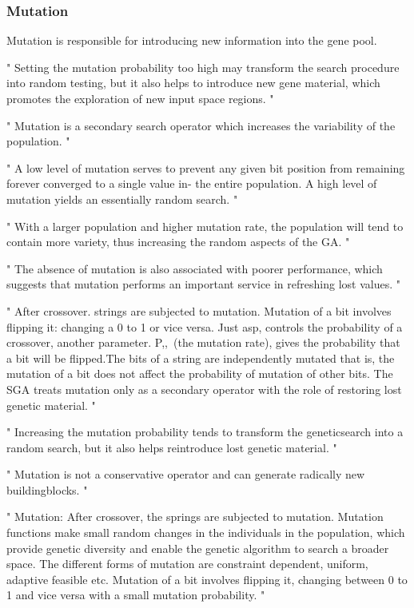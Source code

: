 \subsubsection{Mutation}
Mutation is responsible for introducing new information into the gene pool.

"
Setting the mutation probability too high may transform the search procedure into random testing, but it also helps to introduce new gene material, which promotes the exploration of new input space regions.
"\cite{klampfl_using_nodate}

"
Mutation is a secondary search operator which increases the variability of the population.
"\cite{grefenstette_optimization_1986}

"
A low level of mutation serves to prevent any given bit position from remaining forever converged to a single value in- the entire population. A high level of mutation yields an essentially random search.
"\cite{grefenstette_optimization_1986}

"
With a larger population and higher mutation rate, the population will tend to contain more variety, thus increasing the random aspects of the GA.
"\cite{grefenstette_optimization_1986}

"
The absence of mutation is also associated with poorer performance, which suggests that mutation performs an important service in refreshing lost values.
"\cite{grefenstette_optimization_1986}

"
After crossover. strings are subjected to mutation. Mutation of a bit involves flipping it: changing a 0 to 1 or vice versa. Just asp, controls the probability of a crossover, another parameter. P,,~(the mutation rate), gives the probability that a bit will be flipped.The bits of a string are independently mutated that is, the mutation of a bit does not affect the probability of mutation of other bits. The SGA treats mutation only as a secondary operator with the role of restoring lost genetic material.
"\cite{srinivas_genetic_1994}

"
Increasing the mutation probability tends to transform the geneticsearch into a random search, but it also helps reintroduce lost genetic material.
"\cite{srinivas_genetic_1994}

"
Mutation is not a conservative operator and can generate radically new buildingblocks.
"\cite{srinivas_genetic_1994}


"
Mutation: After crossover, the springs are subjected to mutation. Mutation functions make small random changes in the individuals in the population, which provide genetic diversity and enable the genetic algorithm to search a broader space. The different forms of mutation are constraint dependent, uniform, adaptive feasible etc. Mutation of a bit involves flipping it, changing between 0 to 1 and vice versa with a small mutation probability.
"\cite{majumdar_genetic_2015}

